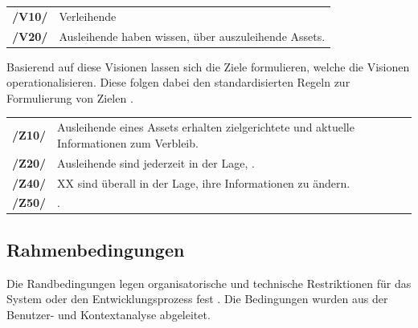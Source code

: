 \begin{center}
        \renewcommand{\arraystretch}{1.5}
        \begin{tabular}{p{}p{}}
                \hline
                \textbf{/V10/} & Verleihende   \\
                \textbf{/V20/} & Ausleihende haben wissen, über auszuleihende Assets. \\
                \hline
        \end{tabular}
\end{center}

Basierend auf diese Visionen lassen sich die Ziele formulieren, welche die Visionen
operationalisieren. Diese folgen dabei den standardisierten Regeln zur Formulierung von Zielen
\cite{pohl_requirements_2008}.


\begin{center}
        \renewcommand{\arraystretch}{1.5}
        \begin{tabular}{p{}p{}}
                \hline
                \textbf{/Z10/} & Ausleihende eines Assets erhalten zielgerichtete und aktuelle
                Informationen zum Verbleib.      \\
                \textbf{/Z20/} & Ausleihende sind jederzeit in der Lage, . \\
                \textbf{/Z40/} & XX sind überall in der Lage, ihre Informationen zu ändern. \\
                \textbf{/Z50/} & .                                       \\
                \hline
        \end{tabular}
\end{center}

\subsection*{Rahmenbedingungen}
\label{section:rahmen}
Die Randbedingungen legen organisatorische und technische Restriktionen für das System oder den
Entwicklungsprozess fest \cite{balzert2009}. Die Bedingungen wurden aus der Benutzer- und
Kontextanalyse abgeleitet.

